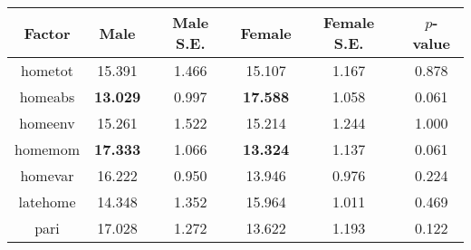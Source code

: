 \begin{longtable}{c c c c c c}
\toprule
\textbf{Factor} & \textbf{Male} & \textbf{Male S.E.}  & \textbf{Female} & \textbf{Female S.E.} & \textbf{$ p $-value} \\
\midrule
hometot & 15.391 & 1.466 &  15.107 & 1.167 & 0.878 \\
homeabs &  \textbf{13.029} & 0.997 &   \textbf{17.588} & 1.058 &0.061 \\
homeenv & 15.261 & 1.522 &  15.214 & 1.244 & 1.000 \\
homemom &  \textbf{17.333} & 1.066 &   \textbf{13.324} & 1.137 &0.061 \\
homevar & 16.222 & 0.950 &  13.946 & 0.976 & 0.224 \\
latehome & 14.348 & 1.352 &  15.964 & 1.011 & 0.469 \\
pari & 17.028 & 1.272 &  13.622 & 1.193 & 0.122 \\
\bottomrule
\end{longtable}
